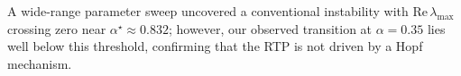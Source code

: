A wide-range parameter sweep uncovered a conventional instability with $\mathrm{Re}\,\lambda_{\max}$ crossing zero near $\alpha^\star\approx0.832$; however, our observed transition at $\alpha=0.35$ lies well below this threshold, confirming that the RTP is not driven by a Hopf mechanism.
